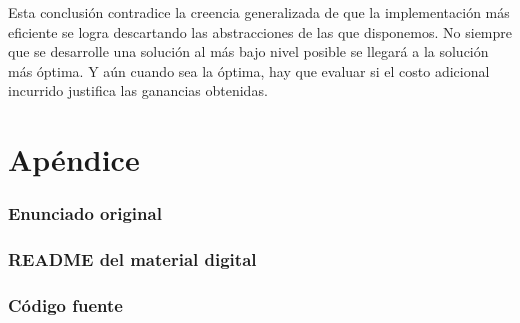 \documentclass[a4paper,11pt]{article}
\begin{document}
Esta conclusión contradice la creencia generalizada de que la implementación
más eficiente se logra descartando las abstracciones de las que disponemos. No
siempre que se desarrolle una solución al más bajo nivel posible se llegará a
la solución más óptima. Y aún cuando sea la óptima, hay que evaluar si el costo
adicional incurrido justifica las ganancias obtenidas.

\clearpage

\part{Apéndice}
\appendix

\section{Enunciado original}\label{sec:enunciado}


\clearpage
\section{README del material digital}\label{sec:readme}


\clearpage
\section{Código fuente}\label{sec:source}
\clearpage
{}

%
%
\end{document}
